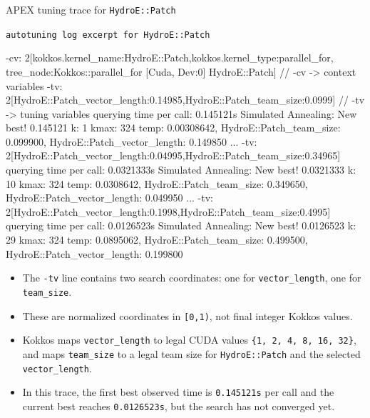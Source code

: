 \documentclass[11pt]{beamer}
\begin{document}
\begin{frame}[fragile,t]{APEX tuning trace for \texttt{HydroE::Patch}}
\begin{beamerboxesrounded}[upper=terminal title,lower=terminal body,width=\linewidth,shadow=false]{%
\textcolor{red!70}{\footnotesize\textbullet}\hspace{0.15em}%
\textcolor{yellow!80}{\footnotesize\textbullet}\hspace{0.15em}%
\textcolor{green!70!black}{\footnotesize\textbullet}\hspace{0.55em}%
\texttt{\scriptsize autotuning log excerpt for HydroE::Patch}}
{\ttfamily\tiny\color{termText}
  \begin{semiverbatim}
  -cv: 2[kokkos.kernel_name:HydroE::Patch,kokkos.kernel_type:parallel_for,
        tree_node:Kokkos::parallel_for [Cuda, Dev:0] HydroE::Patch] \textcolor{termText!45!termBg}{         // -cv -> context variables}
  -tv: 2[HydroE::Patch_vector_length:0.14985,HydroE::Patch_team_size:0.0999] \textcolor{termText!45!termBg}{// -tv -> tuning variables}
  querying time per call: \textcolor{red!80!black}{0.145121s}
\textcolor{hotspotBlue}{Simulated Annealing: New best! \textcolor{red!80!black}{0.145121} k: 1 kmax: 324 temp: 0.00308642,}
\textcolor{hotspotBlue}{HydroE::Patch_team_size: 0.099900, HydroE::Patch_vector_length: 0.149850}
  ...
  -tv: 2[HydroE::Patch_vector_length:0.04995,HydroE::Patch_team_size:0.34965]
  querying time per call: 0.0321333s
\textcolor{hotspotBlue}{Simulated Annealing: New best! 0.0321333 k: 10 kmax: 324 temp: 0.0308642,}
\textcolor{hotspotBlue}{HydroE::Patch_team_size: 0.349650, HydroE::Patch_vector_length: 0.049950}
  ...
  -tv: 2[HydroE::Patch_vector_length:0.1998,HydroE::Patch_team_size:0.4995]
  querying time per call: \textcolor{red!80!black}{0.0126523s}
\textcolor{hlOrange}{Simulated Annealing: New best! \textcolor{red!80!black}{0.0126523} k: 29 kmax: 324 temp: 0.0895062,}
\textcolor{hlOrange}{HydroE::Patch_team_size: 0.499500, HydroE::Patch_vector_length: 0.199800}
\end{semiverbatim}}
\end{beamerboxesrounded}

\vspace{0.1em}
\scriptsize
\begin{itemize}\itemsep0.03em
    \item The \texttt{-tv} line contains two search coordinates: one for \texttt{vector\_length}, one for \texttt{team\_size}.
    \item These are normalized coordinates in \texttt{[0,1)}, not final integer Kokkos values.
    \item Kokkos maps \texttt{vector\_length} to legal CUDA values \texttt{\{1, 2, 4, 8, 16, 32\}}, and maps \texttt{team\_size} to a legal team size for \texttt{HydroE::Patch} and the selected \texttt{vector\_length}.
    \item In this trace, the first best observed time is \texttt{\textcolor{red!80!black}{0.145121s}} per call and the current best reaches \texttt{\textcolor{red!80!black}{0.0126523s}}, but the search has not converged yet.
\end{itemize}
\end{frame}
\end{document}

